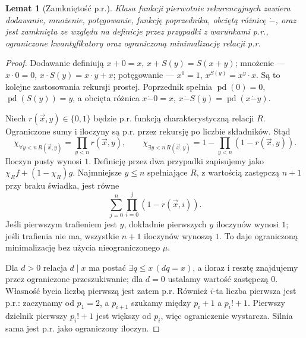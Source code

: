 \documentclass[11pt,a4paper]{article}
\numberwithin{equation}{section}
\newcommand{\dotminus}{\mathbin{\dot-}}
\theoremstyle{plain}
\newtheorem{lemat}[twierdzenie]{Lemat}
\theoremstyle{definition}
\theoremstyle{remark}
\begin{document}
\begin{lemat}[Zamkniętość p.r.]\label{res:5:8}
Klasa funkcji pierwotnie rekurencyjnych zawiera dodawanie, mnożenie, potęgowanie, funkcję poprzednika, obciętą różnicę $\dotminus$, oraz jest zamknięta ze względu na definicje przez przypadki z warunkami p.r., ograniczone kwantyfikatory oraz ograniczoną minimalizację relacji p.r.
\end{lemat}
\begin{proof}
Dodawanie definiują $x+0=x$, $x+S(y)=S(x+y)$; mnożenie --- $x\cdot0=0$, $x\cdot S(y)=x\cdot y+x$; potęgowanie --- $x^0=1$, $x^{S(y)}=x^y\cdot x$. Są to kolejne zastosowania rekursji prostej. Poprzednik spełnia $\operatorname{pd}(0)=0$, $\operatorname{pd}(S(y))=y$, a obcięta różnica $x\dotminus0=x$, $x\dotminus S(y)=\operatorname{pd}(x\dotminus y)$.

Niech $r(\vec x,y)\in\{0,1\}$ będzie p.r. funkcją charakterystyczną relacji $R$. Ograniczone sumy i iloczyny są p.r. przez rekursję po liczbie składników. Stąd
\[
\chi_{\forall y<n\,R(\vec x,y)}=\prod_{y<n}r(\vec x,y),\qquad
\chi_{\exists y<n\,R(\vec x,y)}=1-\prod_{y<n}(1-r(\vec x,y)).
\]
Iloczyn pusty wynosi $1$. Definicję przez dwa przypadki zapisujemy jako $\chi_R f+(1-\chi_R)g$. Najmniejsze $y\le n$ spełniające $R$, z wartością zastępczą $n+1$ przy braku świadka, jest równe
\[
\sum_{j=0}^{n}\prod_{i=0}^{j}(1-r(\vec x,i)).
\]
Jeśli pierwszym trafieniem jest $y$, dokładnie pierwszych $y$ iloczynów wynosi $1$; jeśli trafienia nie ma, wszystkie $n+1$ iloczynów wynoszą $1$. To daje ograniczoną minimalizację bez użycia nieograniczonego $\mu$.

Dla $d>0$ relacja $d\mid x$ ma postać $\exists q\le x\,(dq=x)$, a iloraz i resztę znajdujemy przez ograniczone przeszukiwanie; dla $d=0$ ustalamy wartość zastępczą $0$. Własność bycia liczbą pierwszą jest zatem p.r. Również $i$-ta liczba pierwsza jest p.r.: zaczynamy od $p_1=2$, a $p_{i+1}$ szukamy między $p_i+1$ a $p_i!+1$. Pierwszy dzielnik pierwszy $p_i!+1$ jest większy od $p_i$, więc ograniczenie wystarcza. Silnia sama jest p.r. jako ograniczony iloczyn.
\end{proof}
\end{document}
